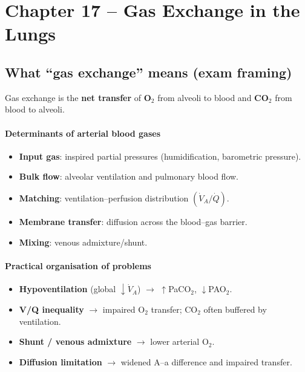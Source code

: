\documentclass[11pt,a4paper]{article}
\begin{document}


\section{Chapter 17 -- Gas Exchange in the Lungs }

\subsection{What ``gas exchange'' means (exam framing)}
Gas exchange is the \textbf{net transfer} of \textbf{O$_2$} from alveoli to blood and \textbf{CO$_2$} from blood to alveoli.

\paragraph{Determinants of arterial blood gases}
\begin{itemize}
  \item \textbf{Input gas}: inspired partial pressures (humidification, barometric pressure).
  \item \textbf{Bulk flow}: alveolar ventilation and pulmonary blood flow.
  \item \textbf{Matching}: ventilation--perfusion distribution \((\dot V_A/\dot Q)\).
  \item \textbf{Membrane transfer}: diffusion across the blood--gas barrier.
  \item \textbf{Mixing}: venous admixture/shunt.
\end{itemize}

\paragraph{Practical organisation of problems}
\begin{itemize}
  \item \textbf{Hypoventilation} (global \(\downarrow \dot V_A\)) \(\rightarrow\) \(\uparrow\)PaCO$_2$, \(\downarrow\)PAO$_2$.
  \item \textbf{V/Q inequality} \(\rightarrow\) impaired O$_2$ transfer; CO$_2$ often buffered by ventilation.
  \item \textbf{Shunt / venous admixture} \(\rightarrow\) lower arterial O$_2$.
  \item \textbf{Diffusion limitation} \(\rightarrow\) widened A--a difference and impaired transfer.
\end{itemize}
\end{document}
